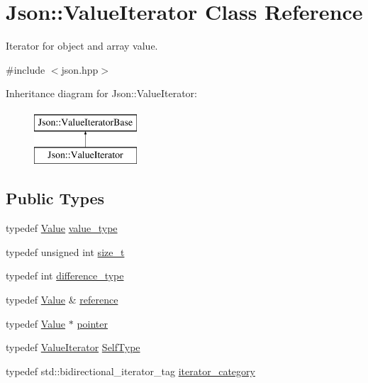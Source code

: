 \hypertarget{classJson_1_1ValueIterator}{}\section{Json\+:\+:Value\+Iterator Class Reference}
\label{classJson_1_1ValueIterator}


Iterator for object and array value.  




{\ttfamily \#include $<$json.\+hpp$>$}

Inheritance diagram for Json\+:\+:Value\+Iterator\+:\begin{figure}[H]
\begin{center}
\leavevmode
\includegraphics[height=2.000000cm]{classJson_1_1ValueIterator}
\end{center}
\end{figure}
\subsection*{Public Types}
\begin{DoxyCompactItemize}
\item 
typedef \hyperlink{classJson_1_1Value}{Value} \hyperlink{classJson_1_1ValueIterator_a2c5ba7be611f05546530c8a88b2d2e37}{value\+\_\+type}
\item 
typedef unsigned int \hyperlink{classJson_1_1ValueIterator_a308b8932ffc83eaa9d12dadd5c11a7dd}{size\+\_\+t}
\item 
typedef int \hyperlink{classJson_1_1ValueIterator_a2be1a9aa60bbfc8812e9dd1a7f1a8786}{difference\+\_\+type}
\item 
typedef \hyperlink{classJson_1_1Value}{Value} \& \hyperlink{classJson_1_1ValueIterator_ae87929b4567aa00372cf602c43b57160}{reference}
\item 
typedef \hyperlink{classJson_1_1Value}{Value} $\ast$ \hyperlink{classJson_1_1ValueIterator_acec45feb1ef1f3bf81240157d06d5432}{pointer}
\item 
typedef \hyperlink{classJson_1_1ValueIterator}{Value\+Iterator} \hyperlink{classJson_1_1ValueIterator_a23357670fdad61792670d86f62db7e16}{Self\+Type}
\item 
typedef std\+::bidirectional\+\_\+iterator\+\_\+tag \hyperlink{classJson_1_1ValueIteratorBase_a02fd11a4fbdc0007da1e8bcf5e6b83c3}{iterator\+\_\+category}
\end{DoxyCompactItemize}

